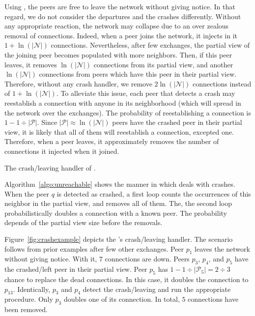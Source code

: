 Using \SPRAY{}, the peers are free to leave the network without giving
notice. In that regard, we do not consider the departures and the crashes
differently.  Without any appropriate reaction, the network may collapse due to
an over zealous removal of connections. Indeed, when a peer joins the network,
it injects in it $1+\ln(|\mathcal{N}|)$ connections. Nevertheless, after few
exchanges, the partial view of the joining peer becomes populated with more
neighbors. Then, if this peer leaves, it removes $\ln(|\mathcal{N}|)$
connections from its partial view, and another $\ln(|\mathcal{N}|)$ connections
from peers which have this peer in their partial view. Therefore, without any
crash handler, we remove $2\ln(|\mathcal{N}|)$ connections instead of
$1+\ln(|\mathcal{N}|)$. To alleviate this issue, each peer that detects a crash
may reestablish a connection with anyone in its neighborhood (which will spread
in the network over the exchanges). The probability of reestablishing a
connection is $1-{1\div{|\mathcal{P}|}}$. Since
${|\mathcal{P}|}\approx \ln(|\mathcal{N}|)$ peers have the crashed peer in
their partial view, it is likely that all of them will reestablish a
connection, excepted one. Therefore, when a peer leaves, it approximately
removes the number of connections it injected when it joined.

\begin{algorithm}[h]
  
  \caption{\label{algo:unreachable}The crash/leaving handler of \SPRAY{}.}
\end{algorithm}

Algorithm~\ref{algo:unreachable} shows the manner in which \SPRAY{} deals
with crashes. When the peer $q$ is detected as crashed, a first loop counts the
occurrences of this neighbor in the partial view, and removes all of them. The,
the second loop probabilistically doubles a connection with a known peer. The
probability depends of the partial view size before the removals.

Figure~\ref{fig:crashexample} depicts the \SPRAY{}'s crash/leaving
handler. The scenario follows from prior examples after few other
exchanges. Peer $p_1$ leaves the network without giving notice. With
it, $7$ connections are down. Peers $p_3$, $p_4$, and $p_5$ have the
crashed/left peer in their partial view. Peer $p_5$ has
$1-{1\div{|\mathcal{P}_5|}}={2\div{3}}$ chance to replace the dead
connections. In this case, it doubles the connection to
$p_{13}$. Identically, $p_3$ and $p_4$ detect the crash/leaving and
run the appropriate procedure. Only $p_3$ doubles one of its
connection. In total, $5$ connections have been removed.  

